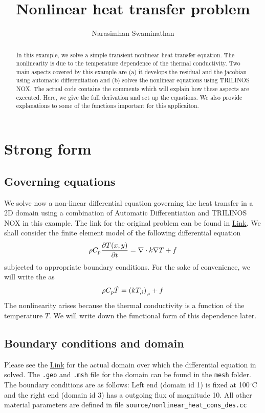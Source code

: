 \documentclass[preprint,12pt]{elsarticle}
\title{Nonlinear heat transfer problem}
\author{Narasimhan Swaminathan}
\affiliation{Department of Mechanical Engieeering, Indian Institute of Technology Madras, Chennai, 600036}
\newcommand{\te}[1]{\lstinline{#1}}
\numberwithin{equation}{section}
\begin{document}
	\begin{abstract}
		In this example, we solve  a simple  transient nonlinear heat transfer equation. The nonlinearity is due to the temperature dependence of the thermal conductivity.  Two main aspects covered by this example are (a) it develops the residual and the jacobian using automatic differentiation and (b) solves the nonlinear equations using TRILINOS NOX. The actual code contains the comments which will explain how these aspects are executed. Here, we give the full derivation and set up the equations. We also provide explanations to some of the functions important for this applicaiton. 
	\end{abstract}
	\maketitle
\section{Strong form}
\subsection{Governing equations}
We solve now a non-linear differential equation governing the heat transfer in a 2D domain using a combination of Automatic Differentiation and TRILINOS NOX in this example. The link for the original problem can be found in \href{https://www.mathworks.com/help/pde/ug/heat-transfer-problem-with-temperature-dependent-properties.html}{Link}. We shall consider the finite element model of the following differential equation
\begin{equation}
	\rho C_p \frac{\partial T(x,y)}{\partial t} = \nabla \cdot k \nabla T + f \label{eq:sf1}
\end{equation}
subjected to appropriate boundary conditions. For the sake of convenience, we will write the  as
\begin{equation}
	\rho C_p \dot{T} = \left( k T_{,i} \right)_{,i} + f \label{eq:sf2}
\end{equation}
The nonlinearity arises because the thermal conductivity is a function of the temperature $T$. We will write down the functional form of this dependence later.
\subsection{Boundary conditions and domain}
Please see the \href{https://www.mathworks.com/help/pde/ug/heat-transfer-problem-with-temperature-dependent-properties.html}{Link} for the actual domain over which the differential equation in solved. The \te{.geo} and \te{.msh} file for the domain can be found in the \te{mesh} folder. The boundary conditions are as follows: Left end (domain id 1) is fixed at 100$^\circ$C and the right end (domain id 3) has a outgoing flux of magnitude 10. All other material parameters are defined in file \te{source/nonlinear_heat_cons_des.cc} 
\end{document}
